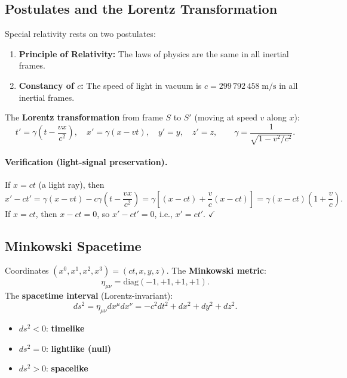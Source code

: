\documentclass[12pt,a4paper]{article}
\theoremstyle{plain}
\theoremstyle{definition}
\theoremstyle{remark}
\begin{document}
\subsection{Postulates and the Lorentz Transformation}

Special relativity rests on two postulates:
\begin{enumerate}
  \item \textbf{Principle of Relativity:} The laws of physics are the same in all inertial frames.
  \item \textbf{Constancy of $c$:} The speed of light in vacuum is $c = 299\,792\,458\;\mathrm{m/s}$ in all inertial frames.
\end{enumerate}

The \textbf{Lorentz transformation} from frame $S$ to $S'$ (moving at speed $v$ along $x$):
\[
  t' = \gamma\!\left(t-\frac{vx}{c^2}\right),
  \quad
  x' = \gamma(x-vt),
  \quad y'=y,\quad z'=z,
  \qquad
  \gamma = \frac{1}{\sqrt{1-v^2/c^2}}.
\]

\paragraph{Verification (light-signal preservation).} If $x=ct$ (a light ray), then
\[
  x'-ct' = \gamma(x-vt) - c\gamma\!\left(t-\frac{vx}{c^2}\right)
  = \gamma\!\left[(x-ct) + \frac{v}{c}(x-ct)\right]
  = \gamma(x-ct)\!\left(1+\frac{v}{c}\right).
\]
If $x=ct$, then $x-ct=0$, so $x'-ct'=0$, i.e., $x'=ct'$. $\checkmark$

\subsection{Minkowski Spacetime}

Coordinates $(x^0,x^1,x^2,x^3)=(ct,x,y,z)$. The \textbf{Minkowski metric}:
\[
  \eta_{\mu\nu} = \mathrm{diag}(-1,+1,+1,+1).
\]
The \textbf{spacetime interval} (Lorentz-invariant):
\[
  ds^2 = \eta_{\mu\nu}dx^\mu dx^\nu = -c^2dt^2+dx^2+dy^2+dz^2.
\]
\begin{itemize}
  \item $ds^2 < 0$: \textbf{timelike}
  \item $ds^2 = 0$: \textbf{lightlike (null)}
  \item $ds^2 > 0$: \textbf{spacelike}
\end{itemize}
\end{document}
